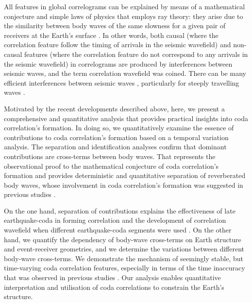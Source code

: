 All features in global correlograms can be explained by means of a mathematical conjecture and simple laws of physics that employs ray theory: they arise due to the similarity between body waves of the same slowness for a given pair of receivers at the Earth's surface  \citep{pham_earths_2018}. In other words, both causal (where the correlation feature follow the timing of arrivals in the seismic wavefield) and non-causal features (where the correlation feature do not correspond to any arrivals in the seismic wavefield) in correlograms are produced by interferences between seismic waves, and the term correlation wavefield was coined. There can be many efficient interferences between seismic waves \citep{sager_sensitivity_2018}, particularly for steeply travelling waves \citep{kennett_nature_2018}.



Motivated by the recent developments described above, here, we present a comprehensive and quantitative analysis that provides practical insights into coda correlation's formation. In doing so, we quantitatively examine the essence of contributions to coda correlation's formation based on a temporal variation analysis. The separation and identification analyses confirm that dominant contributions are cross-terms between body waves. That represents the observational proof to the mathematical conjecture of coda correlation's formation \citep{pham_earths_2018,tkalcic_shear_2018,kennett_nature_2018} and provides deterministic and quantitative separation of reverberated body waves, whose involvement in coda correlation's formation was suggested in previous studies \citep{boue_reverberations_2014,poli_analysis_2017}.



On the one hand, separation of contributions explains the effectiveness of late earthquake-coda in forming correlation \citep{lin_seismic_2013} and the development of correlation wavefield when different earthquake-coda segments were used \citep{poli_analysis_2017,kennett_evolution_2018}. On the other hand, we quantify the dependency of body-wave cross-terms on Earth structure and event-receiver geometries, and we determine the variations between different body-wave cross-terms. We demonstrate the mechanism of seemingly stable, but time-varying coda correlation features, especially in terms of the time inaccuracy that was observed in previous studies \citep[e.g.,][]{boue_reverberations_2014}. Our analysis enables quantitative interpretation and utilisation of coda correlations to constrain the Earth's structure.



